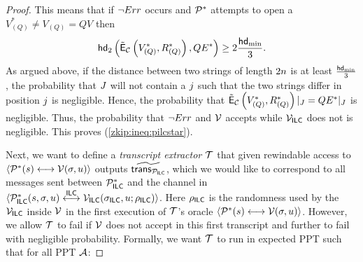 \begin{proof}
This means that if $\neg Err$ occurs and $\mathcal{P}^*$ attempts to open a $V_{(Q)}^*\neq V_{(Q)}=QV$ then 
\[ \mathsf{hd}_2\left(\tilde{\mathsf{E}}_{\mathcal{C}}\left(V_{(Q)}^*,R_{(Q)}^*\right), QE^*\right)\geq 2\frac{\mathsf{hd}_{\mathrm{min}}}{3}.\]
As argued above, if the distance between two strings of length $2n$ is at least $\frac{\mathsf{hd}_{\mathrm{min}}}{3}$, the probability that $J$ will not contain a $j$ such that the two strings differ in position $j$ is negligible. Hence, the probability that $\tilde{\mathsf{E}}_{\mathcal{C}}\left(V_{(Q)}^*,R_{(Q)}^*\right)|_J= QE^*|_J$ is negligible. Thus, the probability that $\neg Err$ and $\mathcal{V}$ accepts while $\mathcal{V}_{\mathsf{ILC}}$ does not is negligible. This proves (\ref{zkip:ineq:pilcstar}).

Next, we want to define a \emph{transcript extractor} $\mathcal{T}$ that given rewindable access to ${\langle \mathcal{P}^*(s)\longleftrightarrow\mathcal{V}(\mathsf{\sigma},u)\rangle}$ outputs $\widetilde{\mathsf{trans}_{\mathcal{P}_{\mathsf{ILC}}}}$, which we would like to correspond to all messages sent between $\mathcal{P}_{\mathsf{ILC}}^*$ and the channel in $ \langle \mathcal{P}_{\mathsf{ILC}}^*(s,\mathsf{\sigma},u)\overset{\mathsf{ILC}}{\longleftrightarrow}\mathcal{V}_{\mathsf{ILC}}(\mathsf{\sigma}_{\mathsf{ILC}},u;\rho_{\mathsf{ILC}})\rangle $. Here $\rho_{\mathsf{ILC}}$ is the randomness used by the $\mathcal{V}_{\mathsf{ILC}}$ inside $\mathcal{V}$ in the first execution of $\mathcal{T}$'s oracle ${\langle \mathcal{P}^*(s)\longleftrightarrow\mathcal{V}(\mathsf{\sigma},u)\rangle}$. However, we allow $\mathcal{T}$ to fail if $\mathcal{V}$ does not accept in this first transcript and further to fail with negligible probability. Formally, we want $\mathcal{T}$ to run in expected PPT such that for all PPT $\mathcal{A}$: 


\end{proof}
